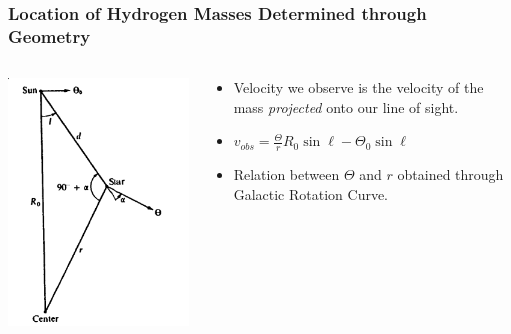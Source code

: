 \documentclass{beamer}
\begin{document}
\begin{frame}
  \frametitle{Location of Hydrogen Masses Determined through Geometry}
  \begin{columns}
    \begin{column}{0.4\textwidth}
  \includegraphics[width=1\textwidth]{geom}
\end{column}
\begin{column}{0.6\textwidth}
  \begin{itemize}
    \item Velocity we observe is the velocity of the mass \textit{projected} onto our line of sight. 
    \item $v_{obs} = \frac{\Theta}{r} R_0 \sin \ell - \Theta_0 \sin \ell$
    \item Relation between $\Theta$ and $r$ obtained through Galactic Rotation Curve.
  \end{itemize} 
\end{column}
\end{columns}
\end{frame}
\end{document}
